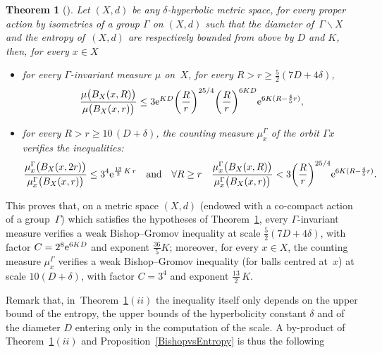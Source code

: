 \documentclass[10pt,a4paper]{amsart}
\numberwithin{equation}{section}
\newtheorem{theor}{Theorem}[section]
\begin{document}
\begin{theor} [{\cite[Theorem~5.1]{BCGS}}]\label{cocompact2}
Let $(X, d) $ be any $ \delta$-hyperbolic metric space, for every proper
action
by isometries of a group $\Gamma$ on $(X,d)$ such that the diameter of~$\Gamma \backslash X$ and the
entropy of~$(X, d) $ are respectively bounded from above by $D$ and $K$,
then, for every $x \in X$
\begin{itemize}\itemsep=0pt
\item[$(i)$]
for every $\Gamma$-invariant measure $\mu$ on~$X$, for every $
R > r \ge \frac{5}{2} (7 D + 4 \delta)$,
\begin{gather*}
\dfrac{\mu \big(B_X(x, R)\big)}{\mu \big(B_X(x, r)\big)}
\le 3 {\rm e}^{K D} \bigg(\frac{R}{r} \bigg)^{25/4} \bigg(\frac{R}{r}\bigg)^{6 K D}
{\rm e}^{6 K (R - \frac{4}{5} r)},
\end{gather*}

\item[$(ii)$]
for every $R > r \ge 10\,(D + \delta)$, the counting measure
$\mu^\Gamma_x$ of the orbit $\Gamma x$ verifies the inequalities:
\begin{gather*}
\dfrac{\mu_{x}^{\Gamma} \big(B_X (x, 2r)\big)}{\mu_{x}^{\Gamma} \big(B_X (x, r)\big)}
\le 3^4 {\rm e}^{\frac{13}{2} \,K\, r}\quad
\text{and} \quad
\forall R \ge r \quad
\dfrac{\mu_{x}^{\Gamma}\big(B_X(x, R)\big)}{\mu_{x}^{\Gamma} \big(B_X(x, r)\big)}
< 3 \bigg(\frac{R}{r}\bigg)^{25/4} {\rm e}^{6 K (R- \frac{4}{5} r)}.
\end{gather*}
\end{itemize}
\end{theor}

This proves that, on a metric space $ (X,d)$ (endowed with a co-compact action of a group~$\Gamma$) which satisfies the hypotheses of Theorem~\ref{cocompact2},
every $\Gamma$-invariant measure verifies a weak Bishop--Gromov inequality at scale $\frac{5}{2} (7 D + 4 \delta)$, with factor $C = 2^{8} {\rm e}^{6 K D}$
and exponent $\frac{36}{5} K$; moreover, for every $x \in X$, the counting measure $\mu_{x}^{\Gamma}$ verifies a weak
Bishop--Gromov inequality (for balls centred at~$x$) at scale $10 (D + \delta)$, with factor $C = 3^{4}$ and exponent $\frac{13}{2} \,K$.

Remark that, in~Theorem~\ref{cocompact2}$(ii)$ the inequality itself only depends on the upper bound of the entropy, the upper bounds of the hyperbolicity
constant $\delta$ and of the diameter $D$ entering only in the computation of the scale. A by-product of Theorem~\ref{cocompact2}$(ii)$ and Proposition~\ref{BishopvsEntropy} is thus the following
\end{document}
